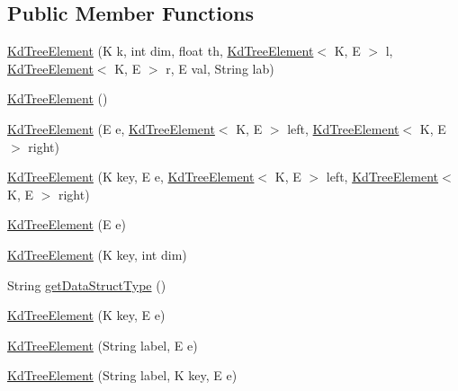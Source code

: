 \subsection*{Public Member Functions}
\begin{DoxyCompactItemize}
\item 
\mbox{\hyperlink{classbridges_1_1base_1_1_kd_tree_element_a6acdec52089792d20747c10f56139217}{Kd\+Tree\+Element}} (K k, int dim, float th, \mbox{\hyperlink{classbridges_1_1base_1_1_kd_tree_element}{Kd\+Tree\+Element}}$<$ K, E $>$ l, \mbox{\hyperlink{classbridges_1_1base_1_1_kd_tree_element}{Kd\+Tree\+Element}}$<$ K, E $>$ r, E val, String lab)
\item 
\mbox{\hyperlink{classbridges_1_1base_1_1_kd_tree_element_a11cb855f1a151714ee24901a9e91e0da}{Kd\+Tree\+Element}} ()
\item 
\mbox{\hyperlink{classbridges_1_1base_1_1_kd_tree_element_a1db51371824c570a937aa2a78a6cc744}{Kd\+Tree\+Element}} (E e, \mbox{\hyperlink{classbridges_1_1base_1_1_kd_tree_element}{Kd\+Tree\+Element}}$<$ K, E $>$ left, \mbox{\hyperlink{classbridges_1_1base_1_1_kd_tree_element}{Kd\+Tree\+Element}}$<$ K, E $>$ right)
\item 
\mbox{\hyperlink{classbridges_1_1base_1_1_kd_tree_element_a504060ecd4861b5b4de851b72f5bfffc}{Kd\+Tree\+Element}} (K key, E e, \mbox{\hyperlink{classbridges_1_1base_1_1_kd_tree_element}{Kd\+Tree\+Element}}$<$ K, E $>$ left, \mbox{\hyperlink{classbridges_1_1base_1_1_kd_tree_element}{Kd\+Tree\+Element}}$<$ K, E $>$ right)
\item 
\mbox{\hyperlink{classbridges_1_1base_1_1_kd_tree_element_a671342818955bc2c49b326251fde8a1b}{Kd\+Tree\+Element}} (E e)
\item 
\mbox{\hyperlink{classbridges_1_1base_1_1_kd_tree_element_a438fde369fff7d1c34e2007db0e07239}{Kd\+Tree\+Element}} (K key, int dim)
\item 
String \mbox{\hyperlink{classbridges_1_1base_1_1_kd_tree_element_a56b98bd1f3e1e5c0c37519c4b3cf5ba2}{get\+Data\+Struct\+Type}} ()
\item 
\mbox{\hyperlink{classbridges_1_1base_1_1_kd_tree_element_a0ee0c961255e89e18529a5c951db53d9}{Kd\+Tree\+Element}} (K key, E e)
\item 
\mbox{\hyperlink{classbridges_1_1base_1_1_kd_tree_element_a74c3ed00a266215c716ebc945b8d1a69}{Kd\+Tree\+Element}} (String label, E e)
\item 
\mbox{\hyperlink{classbridges_1_1base_1_1_kd_tree_element_ad2c3a73929648e6afce54536790d94c9}{Kd\+Tree\+Element}} (String label, K key, E e)

\end{DoxyCompactItemize}
